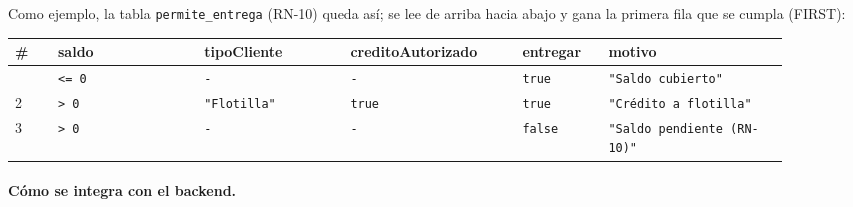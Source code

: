 Como ejemplo, la tabla \texttt{permite\_entrega} (RN-10) queda así; se lee de arriba hacia abajo y gana la
primera fila que se cumpla (FIRST):

{\small
\begin{longtable}{@{}L{0.05\linewidth}L{0.17\linewidth}L{0.17\linewidth}L{0.2\linewidth}L{0.1\linewidth}L{0.21\linewidth}@{}}
\toprule
\textbf{\#} & \textbf{saldo} & \textbf{tipoCliente} & \textbf{creditoAutorizado} & \textbf{entregar} &
\textbf{motivo} \\
\midrule
\endhead
\bottomrule
{} & \texttt{<= 0} & \texttt{-} & \texttt{-} & \texttt{true} & \texttt{"Saldo cubierto"} \\
2 & \texttt{> 0} & \texttt{"Flotilla"} & \texttt{true} & \texttt{true} & \texttt{"Crédito a flotilla"} \\
3 & \texttt{> 0} & \texttt{-} & \texttt{-} & \texttt{false} & \texttt{"Saldo pendiente (RN-10)"} \\
\end{longtable}
}

\paragraph{Cómo se integra con el backend.}

